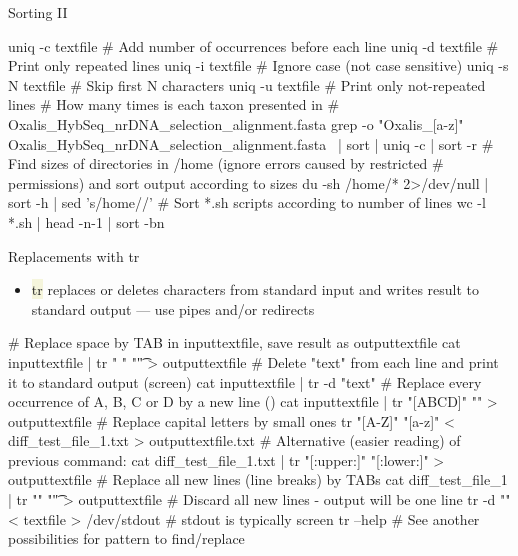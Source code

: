 \documentclass[compress, xelatex, 11pt, xcolor=svgnames, aspectratio=169,
	hyperref={
		bookmarks=true,
		unicode=true,
		colorlinks=true,
		pdftitle={Linux, command line and MetaCentrum},
		plainpages=false,
		pdfauthor={Vojtech Zeisek},
		pdfsubject={Course about use of Linux command line, writing shell scripts and using MetaCentrum of CESNET},
		pdfcreator={XeLaTeX},
		pdfkeywords={Linux, GNU, BASH, shell, command line, MetaCentrum},
		linkcolor=DarkRed, %
		anchorcolor=DarkBlue, %
		citecolor=Indigo, %
		filecolor=NavyBlue, %
		menucolor=DarkMagenta, %
		urlcolor=DarkBlue, %
		},
	url={hyphens, lowtilde} %
	]{beamer}
\renewcommand{\texttt}[1]{\colorbox{Beige}{{\ttfamily #1}}}
\begin{document}
\begin{frame}[fragile]{Sorting II}
	\begin{bashcode}
    uniq -c textfile # Add number of occurrences before each line
    uniq -d textfile # Print only repeated lines
    uniq -i textfile # Ignore case (not case sensitive)
    uniq -s N textfile # Skip first N characters
    uniq -u textfile # Print only not-repeated lines
    # How many times is each taxon presented in
    #  Oxalis_HybSeq_nrDNA_selection_alignment.fasta
    grep -o "Oxalis_[a-z]\+" Oxalis_HybSeq_nrDNA_selection_alignment.fasta \
      | sort | uniq -c | sort -r
    # Find sizes of directories in /home (ignore errors caused by restricted
    # permissions) and sort output according to sizes
    du -sh /home/* 2>/dev/null | sort -h | sed 's/\/home\///'
    # Sort *.sh scripts according to number of lines
    wc -l *.sh | head -n-1 | sort -bn
	\end{bashcode}
\end{frame}

\begin{frame}[fragile]{Replacements with tr}
	\begin{itemize}
		\item \texttt{tr} replaces or deletes characters from standard input and writes result to standard output --- use pipes and/or redirects
	\end{itemize}
	\vfill
	\begin{bashcode}
    # Replace space by TAB in inputtextfile, save result as outputtextfile
    cat inputtextfile | tr " " "\t" > outputtextfile
    # Delete "text" from each line and print it to standard output (screen)
    cat inputtextfile | tr -d "text"
    # Replace every occurrence of A, B, C or D by a new line (\n)
    cat inputtextfile | tr "[ABCD]" "\n" > outputtextfile
    # Replace capital letters by small ones
    tr "[A-Z]" "[a-z]" < diff_test_file_1.txt > outputtextfile.txt
    # Alternative (easier reading) of previous command:
    cat diff_test_file_1.txt | tr "[:upper:]" "[:lower:]" > outputtextfile
    # Replace all new lines (line breaks) by TABs
    cat diff_test_file_1 | tr "\n" "\t"  > outputtextfile
    # Discard all new lines - output will be one line
    tr -d "\n" < textfile > /dev/stdout # stdout is typically screen
    tr --help # See another possibilities for pattern to find/replace
	\end{bashcode}
\end{frame}
\end{document}
